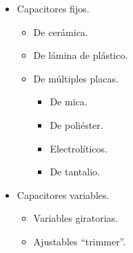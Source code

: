 \documentclass[letter,11pt]{article}
\begin{document}
\begin{enumerate}
\begin{itemize}
\item Capacitores fijos.
\begin{itemize}
    \item De cerámica.
    \item De lámina de plástico.
    \item De múltiples placas.
    \begin{itemize}
        \item De mica.
        \item De poliéster.
        \item Electrolíticos.
        \item De tantalio.
    \end{itemize}
\end{itemize}
\item Capacitores variables.
\begin{itemize}
    \item Variables giratorias.
    \item Ajustables ``trimmer''.
\end{itemize}
\end{itemize}
\end{enumerate}
\end{document}
